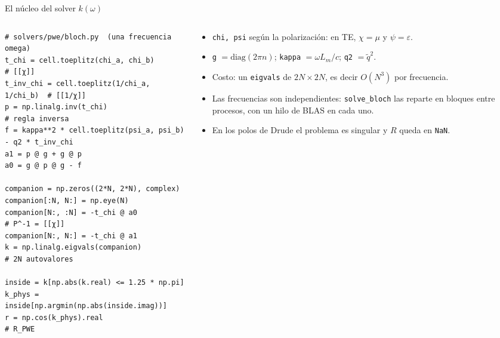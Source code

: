 \documentclass[aspectratio=169,10pt]{beamer}
\begin{document}
\begin{frame}[fragile]{El núcleo del solver $k(\omega)$}
  \begin{columns}[T]
    \begin{column}{0.58\textwidth}
\begin{lstlisting}
# solvers/pwe/bloch.py  (una frecuencia omega)
t_chi = cell.toeplitz(chi_a, chi_b)          # [[χ]]
t_inv_chi = cell.toeplitz(1/chi_a, 1/chi_b)  # [[1/χ]]
p = np.linalg.inv(t_chi)                     # regla inversa
f = kappa**2 * cell.toeplitz(psi_a, psi_b) - q2 * t_inv_chi
a1 = p @ g + g @ p
a0 = g @ p @ g - f

companion = np.zeros((2*N, 2*N), complex)
companion[:N, N:] = np.eye(N)
companion[N:, :N] = -t_chi @ a0              # P^-1 = [[χ]]
companion[N:, N:] = -t_chi @ a1
k = np.linalg.eigvals(companion)             # 2N autovalores

inside = k[np.abs(k.real) <= 1.25 * np.pi]
k_phys = inside[np.argmin(np.abs(inside.imag))]
r = np.cos(k_phys).real                      # R_PWE
\end{lstlisting}
    \end{column}
    \begin{column}{0.40\textwidth}
      \small
      \begin{itemize}
        \item \texttt{chi, psi} según la polarización: en TE, $\chi=\mu$ y $\psi=\varepsilon$.
        \item \texttt{g} $=\mathrm{diag}(2\pi n)$; \texttt{kappa} $=\omega L_m/c$; \texttt{q2} $=\tilde q^2$.
        \item Costo: un \texttt{eigvals} de $2N\times2N$, es decir $O(N^3)$ por frecuencia.
        \item Las frecuencias son independientes: \texttt{solve\_bloch} las reparte en bloques entre procesos, con
          un hilo de BLAS en cada uno.
        \item En los polos de Drude el problema es singular y $R$ queda en \texttt{NaN}.
      \end{itemize}
    \end{column}
  \end{columns}
\end{frame}
\end{document}
